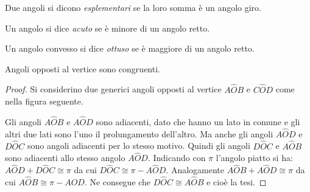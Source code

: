 \begin{definizione}
Due angoli si dicono \emph{esplementari} se la loro somma è un angolo giro.
\end{definizione}

\begin{figure}[htb]
\centering
\end{figure}

\begin{definizione}
Un angolo si dice \emph{acuto} se è minore di un angolo retto.
\end{definizione}

\begin{definizione}
Un angolo convesso si dice \emph{ottuso} se è maggiore di un angolo retto.
\end{definizione}

\begin{figure}[htb]
\centering
\end{figure}

\begin{teorema}
Angoli opposti al vertice sono congruenti.
\end{teorema}

\begin{proof}
Si considerino due generici angoli opposti al vertice $A\widehat{O}B$ e $C\widehat{O}D$ come nella figura seguente.
\begin{figure}[htb]
\centering
\end{figure}
Gli angoli $A\widehat{O}B$ e $A\widehat{O}D$ sono adiacenti, dato che hanno un lato in comune e gli altri due lati sono l'uno il prolungamento dell'altro. Ma anche gli angoli $A\widehat{O}D$ e $D\widehat{O}C$ sono angoli adiacenti per lo stesso motivo. Quindi gli angoli $D\widehat{O}C$ e $A\widehat{O}B$ sono adiacenti allo stesso angolo $A\widehat{O}D$.
Indicando con $\pi$ l'angolo piatto si ha: $A\widehat{O}D + D\widehat{O}C \cong \pi$ da cui $D\widehat{O}C\cong \pi - A\widehat{O}D$. Analogamente $A\widehat{O}B+A\widehat{O}D\cong\pi$ da cui $A\widehat{O}B\cong \pi-A\widehat{O}D$. Ne consegue che $D\widehat{O}C\cong A\widehat{O}B$ e cioè la tesi.
\end{proof}

